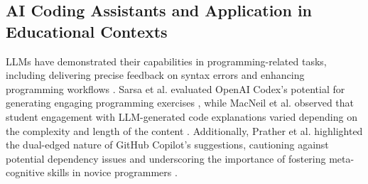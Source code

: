 

\subsection{AI Coding Assistants and Application in Educational Contexts}


LLMs have demonstrated their capabilities in programming-related tasks, including delivering precise feedback on syntax errors \cite{phung2023generating} and enhancing programming workflows \cite{leinonen2023using}. Sarsa et al. evaluated OpenAI Codex’s potential for generating engaging programming exercises \cite{sarsa2022automatic}, while MacNeil et al. observed that student engagement with LLM-generated code explanations varied depending on the complexity and length of the content \cite{macneil2023experiences}. Additionally, Prather et al. highlighted the dual-edged nature of GitHub Copilot’s suggestions, cautioning against potential dependency issues and underscoring the importance of fostering meta-cognitive skills in novice programmers \cite{prather2023s}.


